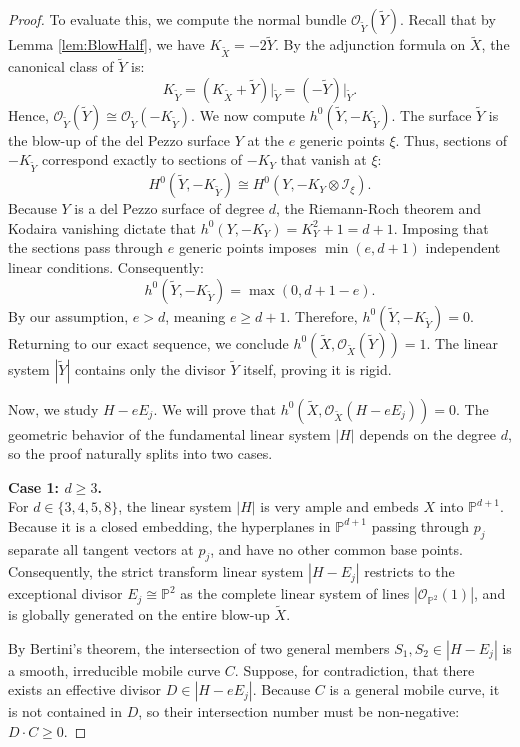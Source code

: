 \documentclass[11pt]{article}
\theoremstyle{definition}
\newcommand{\abs}[1]{\left\vert#1\right\vert}
\newcommand{\OO}{\mathcal{O}}
\newcommand{\PP}{\mathbb{P}}
\begin{document}
\begin{proof}
To evaluate this, we compute the normal bundle $\OO_{\tilde{Y}}(\tilde{Y})$. Recall that by Lemma \ref{lem:BlowHalf}, we have $K_{\tilde{X}} = -2\tilde{Y}$. By the adjunction formula on $\tilde{X}$, the canonical class of $\tilde{Y}$ is:
\[
K_{\tilde{Y}} = (K_{\tilde{X}} + \tilde{Y})\big|_{\tilde{Y}} = (-\tilde{Y})\big|_{\tilde{Y}}.
\]
Hence, $\OO_{\tilde{Y}}(\tilde{Y}) \cong \OO_{\tilde{Y}}(-K_{\tilde{Y}})$. We now compute $h^0(\tilde{Y}, -K_{\tilde{Y}})$. The surface $\tilde{Y}$ is the blow-up of the del Pezzo surface $Y$ at the $e$ generic points $\xi$. Thus, sections of $-K_{\tilde{Y}}$ correspond exactly to sections of $-K_Y$ that vanish at $\xi$:
\[
H^0(\tilde{Y}, -K_{\tilde{Y}}) \cong H^0(Y, -K_Y \otimes \mathcal{I}_{\xi}).
\]
Because $Y$ is a del Pezzo surface of degree $d$, the Riemann-Roch theorem and Kodaira vanishing dictate that $h^0(Y, -K_Y) = K_Y^2 + 1 = d + 1$. Imposing that the sections pass through $e$ generic points imposes $\min(e, d+1)$ independent linear conditions. Consequently:
\[
h^0(\tilde{Y}, -K_{\tilde{Y}}) = \max(0, d + 1 - e).
\]
By our assumption, $e > d$, meaning $e \ge d+1$. Therefore, $h^0(\tilde{Y}, -K_{\tilde{Y}}) = 0$. Returning to our exact sequence, we conclude $h^0(\tilde{X}, \OO_{\tilde{X}}(\tilde{Y})) = 1$. The linear system $\abs{\tilde{Y}}$ contains only the divisor $\tilde{Y}$ itself, proving it is rigid.

\vspace{0.5em}
Now, we study $H - eE_j$. We will prove that $h^0(\tilde{X}, \OO_{\tilde{X}}(H - eE_j)) = 0$. The geometric behavior of the fundamental linear system $\abs{H}$ depends on the degree $d$, so the proof naturally splits into two cases.

\vspace{0.5em}
\noindent\textbf{Case 1: $d \ge 3$.} \\
For $d \in \{3, 4, 5, 8\}$, the linear system $\abs{H}$ is very ample and embeds $X$ into $\PP^{d+1}$. Because it is a closed embedding, the hyperplanes in $\PP^{d+1}$ passing through $p_j$ separate all tangent vectors at $p_j$, and have no other common base points. Consequently, the strict transform linear system $\abs{H - E_j}$ restricts to the exceptional divisor $E_j \cong \PP^2$ as the complete linear system of lines $\abs{\OO_{\PP^2}(1)}$, and is globally generated on the entire blow-up $\tilde{X}$.

By Bertini's theorem, the intersection of two general members $S_1, S_2 \in \abs{H - E_j}$ is a smooth, irreducible mobile curve $C$. Suppose, for contradiction, that there exists an effective divisor $D \in \abs{H - eE_j}$. Because $C$ is a general mobile curve, it is not contained in $D$, so their intersection number must be non-negative: $D \cdot C \ge 0$.


\end{proof}
\end{document}
